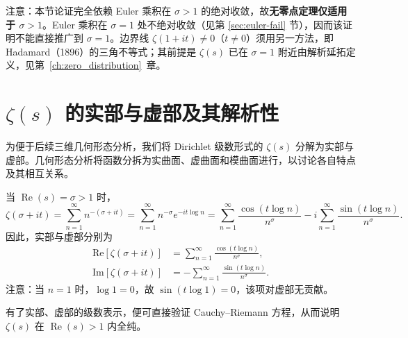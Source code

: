 注意：本节论证完全依赖 Euler 乘积在 $\sigma > 1$ 的绝对收敛，故\textbf{无零点定理仅适用于 $\sigma > 1$}。Euler 乘积在 $\sigma = 1$ 处不绝对收敛（见第 \ref{sec:euler-fail} 节），因而该证明不能直接推广到 $\sigma = 1$。边界线 $\zeta(1+it) \neq 0$（$t \neq 0$）须用另一方法，即 Hadamard（1896）的三角不等式；其前提是 $\zeta(s)$ 已在 $\sigma = 1$ 附近由解析延拓定义，见第~\ref{ch:zero_distribution}~章。

\section{\texorpdfstring{$\zeta(s)$}{Zeta(s)} 的实部与虚部及其解析性}
\label{sec:holo}

为便于后续三维几何形态分析，我们将 Dirichlet 级数形式的 $\zeta(s)$ 分解为实部与虚部。几何形态分析将函数分拆为实曲面、虚曲面和模曲面进行，以讨论各自特点及其相互关系。

当 $\operatorname{Re}(s) = \sigma > 1$ 时，
\begin{equation}
\zeta(\sigma + it) =\sum_{n=1}^{\infty} n^{-(\sigma + it)} 
=\sum_{n=1}^{\infty} n^{-\sigma} e^{-it \log n}
=\sum_{n=1}^{\infty} \frac{\cos(t \log n)}{n^{\sigma}} 
- i\sum_{n=1}^{\infty} \frac{\sin(t \log n)}{n^{\sigma}}.
\end{equation}
因此，实部与虚部分别为
\begin{align}
\mathrm{Re}[\zeta(\sigma + it)] 
&=\sum_{n=1}^{\infty} \frac{\cos(t \log n)}{n^{\sigma}}, \\
\mathrm{Im}[\zeta(\sigma + it)] 
&= -\sum_{n=1}^{\infty} \frac{\sin(t \log n)}{n^{\sigma}}.
\end{align}
注意：当 $n=1$ 时，$\log 1 = 0$，故 $\sin(t \log 1) = 0$，该项对虚部无贡献。

有了实部、虚部的级数表示，便可直接验证 Cauchy--Riemann 方程，从而说明 $\zeta(s)$ 在 $\operatorname{Re}(s)>1$ 内全纯。

